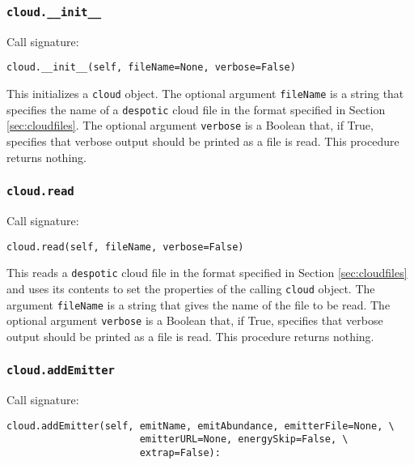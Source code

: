 \documentclass[12pt]{article}
\begin{document}
\subsubsection{\texttt{cloud.\_\_init\_\_}}

Call signature:

\begin{verbatim}
cloud.__init__(self, fileName=None, verbose=False)
\end{verbatim}

This initializes a \texttt{cloud} object. The optional argument \texttt{fileName} is a string that specifies the name of a \texttt{despotic} cloud file in the format specified in Section \ref{sec:cloudfiles}. The optional argument \texttt{verbose} is a Boolean that, if True, specifies that verbose output should be printed as a file is read. This procedure returns nothing.

\subsubsection{\texttt{cloud.read}}

Call signature:

\begin{verbatim}
cloud.read(self, fileName, verbose=False)
\end{verbatim}

This reads a \texttt{despotic} cloud file in the format specified in Section \ref{sec:cloudfiles} and uses its contents to set the properties of the calling \texttt{cloud} object. The argument \verb=fileName= is a string that gives the name of the file to be read. The optional argument \texttt{verbose} is a Boolean that, if True, specifies that verbose output should be printed as a file is read. This procedure returns nothing.

\subsubsection{\texttt{cloud.addEmitter}}
\label{sec:cloud.addEmitter}

Call signature:

\begin{verbatim}
cloud.addEmitter(self, emitName, emitAbundance, emitterFile=None, \
                       emitterURL=None, energySkip=False, \
                       extrap=False):
\end{verbatim}
\end{document}
